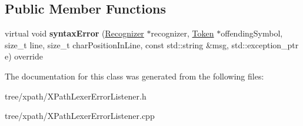 \subsection*{Public Member Functions}
\begin{DoxyCompactItemize}
\item 
\mbox{\label{classantlr4_1_1tree_1_1xpath_1_1XPathLexerErrorListener_a658af4b49df8a728ff21483a6c260803}} 
virtual void {\bfseries syntax\+Error} (\hyperlink{classantlr4_1_1Recognizer}{Recognizer} $\ast$recognizer, \hyperlink{classantlr4_1_1Token}{Token} $\ast$offending\+Symbol, size\+\_\+t line, size\+\_\+t char\+Position\+In\+Line, const std\+::string \&msg, std\+::exception\+\_\+ptr e) override
\end{DoxyCompactItemize}


The documentation for this class was generated from the following files\+:\begin{DoxyCompactItemize}
\item 
tree/xpath/X\+Path\+Lexer\+Error\+Listener.\+h\item 
tree/xpath/X\+Path\+Lexer\+Error\+Listener.\+cpp\end{DoxyCompactItemize}
